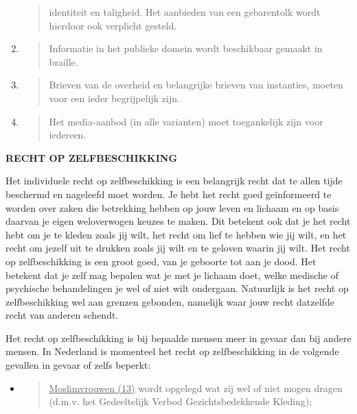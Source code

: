 \begin{enumerate}
\begin{quote}
  identiteit en taligheid. Het aanbieden van een gebarentolk wordt
  hierdoor ook verplicht gesteld.
  \end{quote}
\item
  \begin{quote}
  Informatie in het publieke domein wordt beschikbaar gemaakt in
  braille.
  \end{quote}
\item
  \begin{quote}
  Brieven van de overheid en belangrijke brieven van instanties, moeten
  voor een ieder begrijpelijk zijn.
  \end{quote}
\item
  \begin{quote}
  Het media-aanbod (in alle varianten) moet toegankelijk zijn voor
  iedereen.
  \end{quote}
\end{enumerate}

\textbf{RECHT OP ZELFBESCHIKKING}

Het individuele recht op zelfbeschikking is een belangrijk recht dat te
allen tijde beschermd en nageleefd moet worden. Je hebt het recht goed
geïnformeerd te worden over zaken die betrekking hebben op jouw leven en
lichaam en op basis daarvan je eigen weloverwogen keuzes te maken. Dit
betekent ook dat je het recht hebt om je te kleden zoals jij wilt, het
recht om lief te hebben wie jij wilt, en het recht om jezelf uit te
drukken zoals jij wilt en te geloven waarin jij wilt. Het recht op
zelfbeschikking is een groot goed, van je geboorte tot aan je dood. Het
betekent dat je zelf mag bepalen wat je met je lichaam doet, welke
medische of psychische behandelingen je wel of niet wilt ondergaan.
Natuurlijk is het recht op zelfbeschikking wel aan grenzen gebonden,
namelijk waar jouw recht datzelfde recht van anderen schendt.

Het recht op zelfbeschikking is bij bepaalde mensen meer in gevaar dan
bij andere mensen. In Nederland is momenteel het recht op
zelfbeschikking in de volgende gevallen in gevaar of zelfs beperkt:

\begin{itemize}
\item
  \begin{quote}
  \underline{Moslimvrouwen (13)} wordt opgelegd wat zij wel of niet
  mogen dragen (d.m.v. het Gedeeltelijk Verbod Gezichtsbedekkende
  Kleding);
  \end{quote}
\end{itemize}


